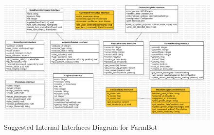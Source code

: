 \begin{figure}[H]
    \centering
    \includegraphics[width=1\textwidth]{Figures/Internal_Interface_Diagram_Suggestions.png}
    \caption{Suggested Internal Interfaces Diagram for FarmBot}\label{fig:internal_interfaces_diagram_suggestions}
\end{figure}

